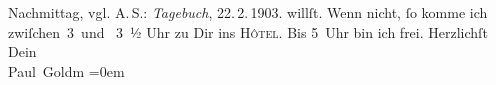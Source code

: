 \begin{ledgroupsized}[t]{13cm}
{{{                  Nachmittag, vgl. A. S.: \emph{Tagebuch}, 22. 2. 1903.}}}\label{K_L03364-2h} willſt. Wenn nicht, ſo {\pb}komme ich
                  zwiſchen 3 und  3 ½
                  Uhr zu Dir ins \textsc{Hôtel}. Bis 5 Uhr bin ich frei.\pend
           \pstart
           Herzlichſt {\\[\baselineskip]}Dein {\\[\baselineskip]}\spacefill\mbox{Paul Goldm}\pend
           \leftskip=0em{}
         
         \endnumbering{}\end{ledgroupsized}  \newcommand{\dateiname}{L03364}\newcommand{\titel}{Paul Goldmann an Arthur Schnitzler, 21. 2. [1903]}\newcommand{\editorInnen}{Martin Anton Müller und Laura Untner}
      